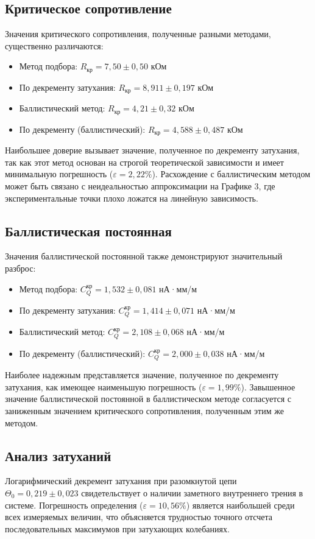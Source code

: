\documentclass[a4paper]{article}
\begin{document}
\subsection{Критическое сопротивление}
Значения критического сопротивления, полученные разными методами, существенно различаются:
\begin{itemize}
    \item Метод подбора: $R_{\text{кр}} = 7,50 \pm 0,50$ кОм
    \item По декременту затухания: $R_{\text{кр}} = 8,911 \pm 0,197$ кОм  
    \item Баллистический метод: $R_{\text{кр}} = 4,21 \pm 0,32$ кОм
    \item По декременту (баллистический): $R_{\text{кр}} = 4,588 \pm 0,487$ кОм
\end{itemize}

Наибольшее доверие вызывает значение, полученное по декременту затухания, так как этот метод основан на строгой теоретической зависимости и имеет минимальную погрешность ($\varepsilon = 2,22\%$). Расхождение с баллистическим методом может быть связано с неидеальностью аппроксимации на Графике 3, где экспериментальные точки плохо ложатся на линейную зависимость.

\subsection{Баллистическая постоянная}
Значения баллистической постоянной также демонстрируют значительный разброс:
\begin{itemize}
    \item Метод подбора: $C_Q^{\text{кр}} = 1,532 \pm 0,081$ нА·мм/м
    \item По декременту затухания: $C_Q^{\text{кр}} = 1,414 \pm 0,071$ нА·мм/м
    \item Баллистический метод: $C_Q^{\text{кр}} = 2,108 \pm 0,068$ нА·мм/м
    \item По декременту (баллистический): $C_Q^{\text{кр}} = 2,000 \pm 0,038$ нА·мм/м
\end{itemize}

Наиболее надежным представляется значение, полученное по декременту затухания, как имеющее наименьшую погрешность ($\varepsilon = 1,99\%$). Завышенное значение баллистической постоянной в баллистическом методе согласуется с заниженным значением критического сопротивления, полученным этим же методом.

\subsection{Анализ затуханий}
Логарифмический декремент затухания при разомкнутой цепи $\Theta_0 = 0,219 \pm 0,023$ свидетельствует о наличии заметного внутреннего трения в системе. Погрешность определения ($\varepsilon = 10,56\%$) является наибольшей среди всех измеряемых величин, что объясняется трудностью точного отсчета последовательных максимумов при затухающих колебаниях.
\end{document}
